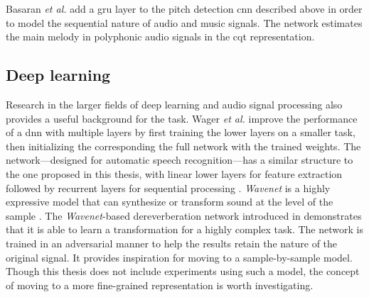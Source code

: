 Basaran {\it et al.} add a \gls{gru} layer \cite{chung2014empirical, ChoK2014arxiv} to the pitch detection \gls{cnn} described above in order to model the sequential nature of \cite{basaranmain} audio and music signals. The network estimates the main melody in polyphonic audio signals in the \gls{cqt} representation. 

\subsection{Deep learning}
Research in the larger fields of deep learning and audio signal processing also provides a useful background for the task. Wager \textit{et al.} improve the performance of a \gls{dnn} with multiple layers by first training the lower layers on a smaller task, then initializing the corresponding the full network with the trained weights. The network---designed for automatic speech recognition---has a similar structure to the one proposed in this thesis, with linear lower layers for feature extraction followed by recurrent layers for sequential processing \cite{wager2020fully}.
\textit{Wavenet} is a highly expressive model that can synthesize or transform sound at the level of the sample \cite{oord2016wavenet}. The \textit{Wavenet}-based dereverberation network introduced in \cite{su2020hifi} demonstrates that it is able to learn a transformation for a highly complex task. The network is trained in an adversarial manner \cite{goodfellow2014generative} to help the results retain the nature of the original signal. It provides inspiration for moving to a sample-by-sample model. Though this thesis does not include experiments using such a model, the concept of moving to a more fine-grained representation is worth investigating.

